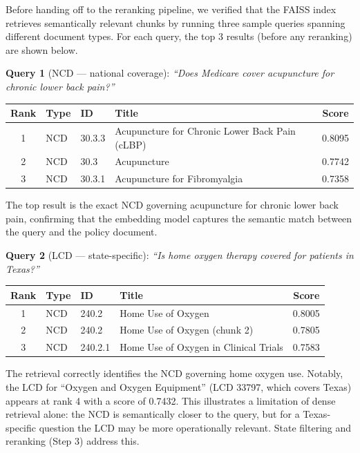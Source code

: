 \documentclass[12pt, letterpaper]{article}
\begin{document}
Before handing off to the reranking pipeline, we verified that the FAISS index
retrieves semantically relevant chunks by running three sample queries spanning
different document types. For each query, the top 3 results (before any reranking)
are shown below.

\textbf{Query 1} (NCD --- national coverage): \textit{``Does Medicare cover acupuncture
for chronic lower back pain?''}

\begin{table}[h]
\centering
\small
\begin{tabular}{@{}clllc@{}}
\toprule
\textbf{Rank} & \textbf{Type} & \textbf{ID} & \textbf{Title} & \textbf{Score} \\
\midrule
1 & NCD & 30.3.3 & Acupuncture for Chronic Lower Back Pain (cLBP) & 0.8095 \\
2 & NCD & 30.3   & Acupuncture                                    & 0.7742 \\
3 & NCD & 30.3.1 & Acupuncture for Fibromyalgia                   & 0.7358 \\
\bottomrule
\end{tabular}
\end{table}

The top result is the exact NCD governing acupuncture for chronic lower back pain,
confirming that the embedding model captures the semantic match between the query
and the policy document.

\textbf{Query 2} (LCD --- state-specific): \textit{``Is home oxygen therapy covered
for patients in Texas?''}

\begin{table}[h]
\centering
\small
\begin{tabular}{@{}clllc@{}}
\toprule
\textbf{Rank} & \textbf{Type} & \textbf{ID} & \textbf{Title} & \textbf{Score} \\
\midrule
1 & NCD & 240.2   & Home Use of Oxygen                    & 0.8005 \\
2 & NCD & 240.2   & Home Use of Oxygen (chunk 2)          & 0.7805 \\
3 & NCD & 240.2.1 & Home Use of Oxygen in Clinical Trials & 0.7583 \\
\bottomrule
\end{tabular}
\end{table}

The retrieval correctly identifies the NCD governing home oxygen use. Notably, the
LCD for ``Oxygen and Oxygen Equipment'' (LCD 33797, which covers Texas) appears at
rank 4 with a score of 0.7432. This illustrates a limitation of dense retrieval alone:
the NCD is semantically closer to the query, but for a Texas-specific question the LCD
may be more operationally relevant. State filtering and reranking (Step 3) address this.
\end{document}
